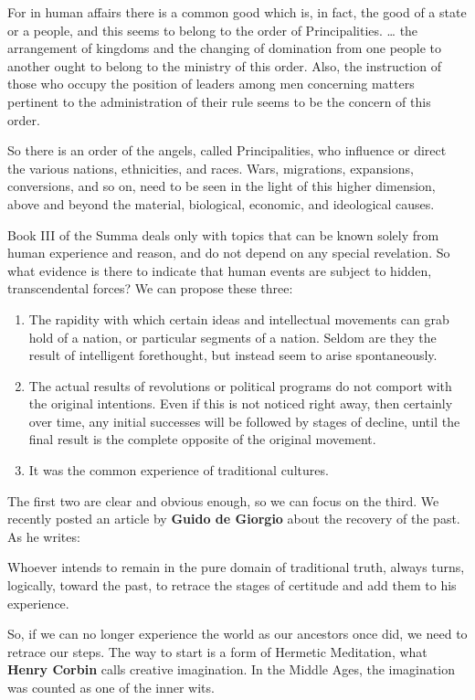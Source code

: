 \begin{quotex}
For in human affairs there is a common good which is, in fact, the good of a state or a people, and this seems to belong to the order of Principalities. … the arrangement of kingdoms and the changing of domination from one people to another ought to belong to the ministry of this order. Also, the instruction of those who occupy the position of leaders among men concerning matters pertinent to the administration of their rule seems to be the concern of this order. 

\end{quotex}
So there is an order of the angels, called Principalities, who influence or direct the various nations, ethnicities, and races. Wars, migrations, expansions, conversions, and so on, need to be seen in the light of this higher dimension, above and beyond the material, biological, economic, and ideological causes.

Book III of the Summa deals only with topics that can be known solely from human experience and reason, and do not depend on any special revelation. So what evidence is there to indicate that human events are subject to hidden, transcendental forces? We can propose these three:

\begin{enumerate}
\item The rapidity with which certain ideas and intellectual movements can grab hold of a nation, or particular segments of a nation. Seldom are they the result of intelligent forethought, but instead seem to arise spontaneously. 
\item The actual results of revolutions or political programs do not comport with the original intentions. Even if this is not noticed right away, then certainly over time, any initial successes will be followed by stages of decline, until the final result is the complete opposite of the original movement. 
\item It was the common experience of traditional cultures. 
\end{enumerate}
The first two are clear and obvious enough, so we can focus on the third. We recently posted an article by \textbf{Guido de Giorgio} about the recovery of the past. As he writes:

\begin{quotex}
Whoever intends to remain in the pure domain of traditional truth, always turns, logically, toward the past, to retrace the stages of certitude and add them to his experience. 

\end{quotex}
So, if we can no longer experience the world as our ancestors once did, we need to retrace our steps. The way to start is a form of Hermetic Meditation, what \textbf{Henry Corbin} calls creative imagination. In the Middle Ages, the imagination was counted as one of the inner wits.

